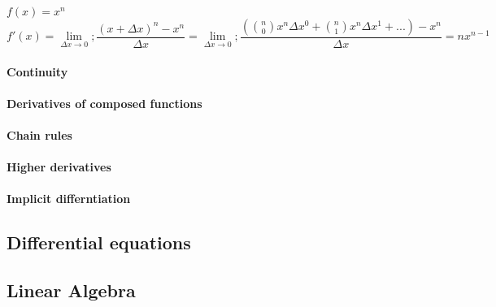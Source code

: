 \documentclass{article}
\begin{document}
                    $f(x) = x^n$\\
                    \[f'(x) = \lim_{\Delta x \to 0}; \frac{(x + \Delta x)^n - x^n}{\Delta x} = \lim_{\Delta x \to 0}; \frac{(\binom n0 x^n \Delta x ^0 + \binom n1 x^n \Delta x ^1 +... ) - x^n}{\Delta x} = nx^{n-1} \]


                    \paragraph{Continuity}

                    \paragraph{Derivatives of composed functions}

                    \paragraph{Chain rules}

                    \paragraph{Higher derivatives}

                    \paragraph{Implicit differntiation}

        \subsection{Differential equations}

        \subsection{Linear Algebra}
\end{document}
